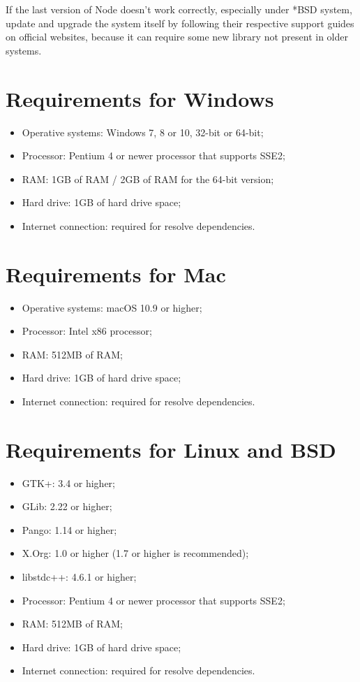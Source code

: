 \documentclass[ManualeSviluppatore]{subfiles}
\begin{document}
If the last version of Node doesn't work correctly, especially under *BSD system, update and upgrade the system itself by following their respective support guides on official websites, because it can require some new library not present in older systems.

\section{Requirements for Windows}
\begin{itemize}
	\item {Operative systems:} Windows 7, 8 or 10, 32-bit or 64-bit;
	\item {Processor:} Pentium 4 or newer processor that supports SSE2;
	\item {RAM:} 1GB of RAM / 2GB of RAM for the 64-bit version;
	\item {Hard drive:} 1GB of hard drive space;
	\item {Internet connection:} required for resolve dependencies.
\end{itemize}

\section{Requirements for Mac}
\begin{itemize}
	\item {Operative systems:} macOS 10.9 or higher;
	\item {Processor:} Intel x86 processor;
	\item {RAM:} 512MB of RAM;
	\item {Hard drive:} 1GB of hard drive space;
	\item {Internet connection:} required for resolve dependencies.
\end{itemize}

\section{Requirements for Linux and BSD}
\begin{itemize}
	\item {GTK+:} 3.4 or higher;
	\item {GLib:} 2.22 or higher;
	\item {Pango:} 1.14 or higher;
	\item {X.Org:} 1.0 or higher (1.7 or higher is recommended);
	\item {libstdc++:} 4.6.1 or higher;
	\item {Processor:} Pentium 4 or newer processor that supports SSE2;
	\item {RAM:} 512MB of RAM;
	\item {Hard drive:} 1GB of hard drive space;
	\item {Internet connection:} required for resolve dependencies.
\end{itemize}
\end{document}
